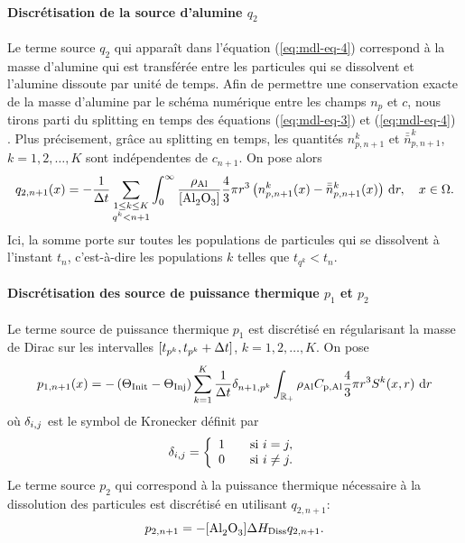 \paragraph{Discrétisation de la source d'alumine $q_{2}$}
Le terme source $q_{2}$ qui apparaît dans l'équation
(\ref{eq:mdl-eq-4}) correspond à la masse d'alumine qui est transférée
entre les particules qui se dissolvent et l'alumine dissoute par unité
de temps. Afin de permettre une conservation exacte de la masse d'alumine
par le schéma numérique entre les champs $n_p$ et $c$, nous
tirons parti du splitting en temps des équations (\ref{eq:mdl-eq-3})
et (\ref{eq:mdl-eq-4}) \cite{Hofer2011}. Plus précisement, grâce au
splitting en temps, les quantités $n_{p,n+1}^k$ et $\bar{\bar n}_{p,n+1}^k$, $k = 1, 2, \dots, K$
sont indépendentes de $c_{n+1}$. On pose alors
\begin{equation}\label{eq:q2}
  q_{2,n+1}(x) = -\frac{1}{\dt} \sum_{\substack{1\leq k\leq K\\ q^k < n+1}}
  \int_{0}^\infty
  \frac{\aluminadensity}{[\ce{Al2O3}]} \frac{4}{3}\pi r^3
  \parent{n_{p,n+1}^k(x) - \bar{\bar n}_{p,n+1}^k(x)} \intd{r}, \quad x\in\Omega.
\end{equation}
Ici, la somme porte sur toutes les populations de particules qui se
dissolvent à l'instant $t_n$, c'est-à-dire les populations $k$
telles que $t_{q^k} < t_n$.


\paragraph{Discrétisation des source de puissance thermique $p_1$ et
$p_2$} Le terme source de puissance thermique $p_1$ est discrétisé
en régularisant la masse de Dirac sur les intervalles $[t_{p^k},
  t_{p^k} + \Delta t]$, $k = 1, 2, \dots, K$. On pose
\begin{equation}\label{eq:p1-discret}
p_{1,n+1}(x) = -\left( \Theta_\text{Init} - \Theta_\text{Inj} \right)\sum_{k = 1}^K
\frac{1}{\Delta t}\delta_{n+1,p^k}\int_{\mathbb R_+} \rho_\mathrm{Al}C_{\mathrm{p,Al}}
\frac{4}{3}\pi r^3S^k(x, r)\,\,\mathrm dr
\end{equation}
où $\delta_{i,j}$ est le symbol de Kronecker définit par
\begin{equation}
  \delta_{i,j} = \left\{
  \begin{array}{ll}
    1&\quad\text{si } i = j,\\
    0&\quad\text{si } i\neq j.
  \end{array}\right.
\end{equation}
Le terme source $p_2$ qui correspond à la puissance thermique
nécessaire à la dissolution des particules est discrétisé en
utilisant $q_{2,n+1}$:
\begin{equation}\label{eq:p2-discret}
p_{2,n+1} = -[\cee{Al2O3}]\aluminadissolutionenthalpy q_{2,n+1}.
\end{equation}

